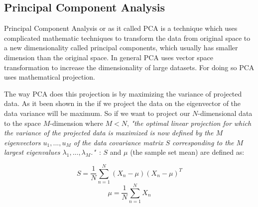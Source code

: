 \documentclass{article} %
\begin{document}
\subsection{Principal Component Analysis}
Principal Component Analysis or as it called PCA is a technique which uses 
complicated mathematic techniques to transform the data from original space 
to a new dimensionality called principal components, which usually has 
smaller dimension than the original space. In general PCA uses vector 
space transformation to increase the dimensionality of large datasets. For 
doing so PCA uses mathematical projection. \cite{richardson2009principal}

The way PCA does this projection is by maximizing the variance of projected 
data. As it been shown in the \cite{bishop2006pattern} if we project the 
data on the eigenvector of the data variance will be maximum. So if we want 
to project our $N$-dimensional data to the space $M$-dimension where $M<N$, 
\textit{"the optimal linear projection for which the variance of the 
projected data is maximized is now defined by the $M$ eigenvectors 
$u_{1}, ... , u_{M}$ of the data covariance matrix $S$ corresponding to the
$M$ largest eigenvalues $\lambda_{1}, ... ,\lambda_{M}$."}~\cite{bishop2006pattern}: 
$S$ and $\mu$ (the sample set mean) are defined as:

\begin{multicols}{2}
\begin{equation}
S = \frac{1}{N} \sum_{n=1}^{N}(X_{n}-\mu)(X_{n}-\mu)^T
\end{equation}\break
\begin{equation}
\mu = \frac{1}{N} \sum_{n=1}^{N}X_{n}
\end{equation}
\end{multicols}
\end{document}
